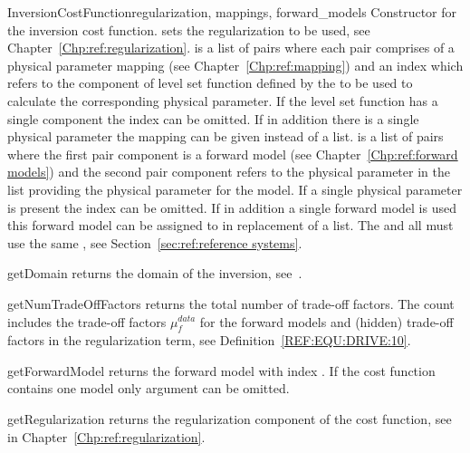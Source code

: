 \begin{classdesc}{InversionCostFunction}{regularization, mappings, forward_models}
Constructor for the inversion cost function.  sets the regularization to be used, see Chapter~\ref{Chp:ref:regularization}.
 is a list of pairs where each pair comprises of a 
physical parameter mapping (see Chapter~\ref{Chp:ref:mapping}) and an index which refers to the component of level set function
defined by the  to be used to calculate the corresponding physical parameter.
If the level set function has a single component the index can be omitted.
If in addition there is a single physical parameter the mapping can be given instead of a list.
 is a list of pairs where the first pair component is a
forward model (see Chapter~\ref{Chp:ref:forward models}) and the second pair
component refers to the physical parameter in the  list
providing the physical parameter for the model.
If a single physical parameter is present the index can be omitted.
If in addition a single forward model is used this forward model can be
assigned to  in replacement of a list.
The  and all  must use the same
, see Section~\ref{sec:ref:reference systems}.
\end{classdesc}

\begin{methoddesc}[InversionCostFunction]{getDomain}{}
returns the \escript domain of the inversion, see~\cite{ESCRIPT}.
\end{methoddesc}
        
\begin{methoddesc}[InversionCostFunction]{getNumTradeOffFactors}{}
returns the total number of trade-off factors.
The count includes the trade-off factors $\mu^{data}_{f}$ for the forward
models and (hidden) trade-off factors in the regularization term,
see Definition~\ref{REF:EQU:DRIVE:10}.
\end{methoddesc}

\begin{methoddesc}[InversionCostFunction]{getForwardModel}{}
returns the forward model with index .
If the cost function contains one model only argument  can be omitted.
\end{methoddesc}
        
\begin{methoddesc}[InversionCostFunction]{getRegularization}{}
returns the regularization component of the cost function, see  in Chapter~\ref{Chp:ref:regularization}.
\end{methoddesc}

